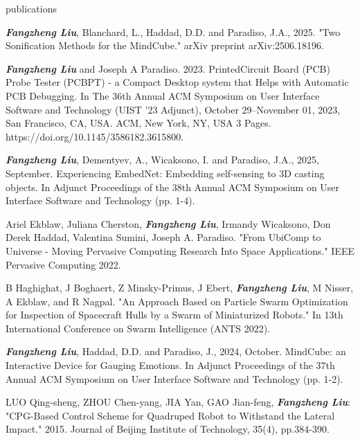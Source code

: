 \documentclass{resume} %
\begin{document}
\begin{rSection}{publications}
\begin{itemlabel}
\item \textbf{\textit{Fangzheng Liu}}, Blanchard, L., Haddad, D.D. and Paradiso, J.A., 2025.
"Two Sonification Methods for the MindCube." arXiv preprint arXiv:2506.18196.
\smallskip

\item \textbf{\textit{Fangzheng Liu}} and Joseph A Paradiso. 2023.
PrintedCircuit Board (PCB) Probe Tester (PCBPT) - a Compact Desktop system that Helps with Automatic PCB Debugging.
In The 36th Annual ACM Symposium on User Interface Software and Technology (UIST '23 Adjunct),
October 29--November 01, 2023, San Francisco, CA, USA. ACM, New York, NY, USA 3 Pages. https://doi.org/10.1145/3586182.3615800.
\smallskip

\item \textbf{\textit{Fangzheng Liu}}, Dementyev, A., Wicaksono, I. and Paradiso, J.A., 2025, September.
Experiencing EmbedNet: Embedding self-sensing to 3D casting objects.
In Adjunct Proceedings of the 38th Annual ACM Symposium on User Interface Software and Technology (pp. 1-4).
\smallskip

\item Ariel Ekblaw, Juliana Cherston, \textbf{\textit{Fangzheng Liu}}, Irmandy Wicaksono, Don Derek Haddad, Valentina Sumini, Joseph A. Paradiso.
"From UbiComp to Universe - Moving Pervasive Computing Research Into Space Applications."
IEEE Pervasive Computing 2022.
\smallskip

\item B Haghighat, J Boghaert, Z Minsky-Primus, J Ebert, \textbf{\textit{Fangzheng Liu}}, M Nisser, A Ekblaw, and R Nagpal.
"An Approach Based on Particle Swarm Optimization for Inspection of Spacecraft Hulls by a Swarm of Miniaturized Robots."
In 13th International Conference on Swarm Intelligence (ANTS 2022).
\smallskip

\item \textbf{\textit{Fangzheng Liu}}, Haddad, D.D. and Paradiso, J., 2024, October.
MindCube: an Interactive Device for Gauging Emotions.
In Adjunct Proceedings of the 37th Annual ACM Symposium on User Interface Software and Technology (pp. 1-2).
\smallskip

\item LUO Qing-sheng, ZHOU Chen-yang, JIA Yan, GAO Jian-feng, \textbf{\textit{Fangzheng Liu}}:
"CPG-Based Control Scheme for Quadruped Robot to Withstand the Lateral Impact."
2015. Journal of Beijing Institute of Technology, 35(4), pp.384-390.
\end{itemlabel}
\end{rSection}
\end{document}
